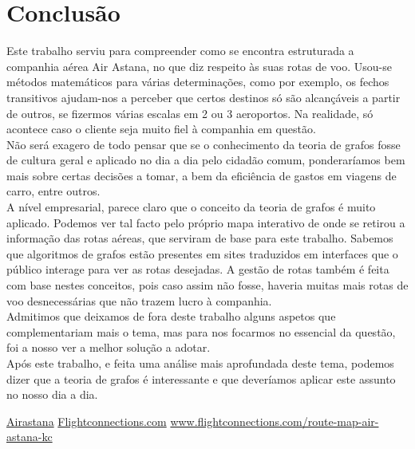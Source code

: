 \chapter{Conclusão}
Este trabalho serviu para compreender como se encontra estruturada a companhia aérea Air Astana, no que diz respeito às suas rotas de voo. Usou-se métodos matemáticos para várias determinações, como por exemplo, os fechos transitivos ajudam-nos a perceber que certos destinos só são alcançáveis a partir de outros, se fizermos várias escalas em 2 ou 3 aeroportos. Na realidade, só acontece caso o cliente seja muito fiel à companhia em questão.\\
\indent Não será exagero de todo pensar que se o conhecimento da teoria de grafos fosse de cultura geral e aplicado no dia a dia pelo cidadão comum, ponderaríamos bem mais sobre certas decisões a tomar, a bem da eficiência de gastos em viagens de carro, entre outros.\\
\indent A nível empresarial, parece claro que o conceito da teoria de grafos é muito aplicado. Podemos ver tal facto pelo próprio mapa interativo de onde se retirou a informação das rotas aéreas, que serviram de base para este trabalho. Sabemos que algoritmos de grafos estão presentes em sites traduzidos em interfaces que o público interage para ver as rotas desejadas. A gestão de rotas também é feita com base nestes conceitos, pois caso assim não fosse, haveria muitas mais rotas de voo desnecessárias que não trazem lucro à companhia.\\
\indent Admitimos que deixamos de fora deste trabalho alguns aspetos que complementariam mais o tema, mas para nos focarmos no essencial da questão, foi a nosso ver a melhor solução a adotar.\\
\indent Após este trabalho, e feita uma análise mais aprofundada deste tema, podemos dizer que a teoria de grafos é interessante e que deveríamos aplicar este assunto no nosso dia a dia.


\begin{thebibliography}{3}
    \href{https://airastana.com/global/en-us}{Airastana}
    \href{https://www.flightconnections.com/}{Flightconnections.com}
    \href{https://www.flightconnections.com/route-map-air-astana-kc}{www.flightconnections.com/route-map-air-astana-kc}
\end{thebibliography}